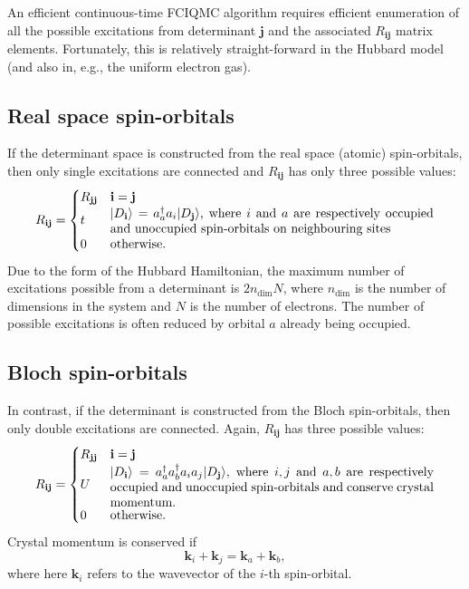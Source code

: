 \documentclass[a4paper, 11pt]{article}
\newcommand{\bi}{\mathbf{i}}
\newcommand{\bj}{\mathbf{j}}
\newcommand{\bk}{\mathbf{k}}
\newcommand{\ket}{\rangle}
\begin{document}
An efficient continuous-time FCIQMC algorithm requires efficient enumeration of all the possible excitations from determinant $\bj$ and the associated $R_{\bi\bj}$ matrix elements.  Fortunately, this is relatively straight-forward in the Hubbard model (and also in, e.g., the uniform electron gas).

\subsection{Real space spin-orbitals}

If the determinant space is constructed from the real space (atomic) spin-orbitals, then only single excitations are connected and $R_{\bi\bj}$ has only three possible values:
\begin{equation}
R_{\bi\bj} = \begin{cases} 
    R_{\bj\bj} & \bi = \bj \\
    t          & \textrm{\parbox{9cm}{$|D_\bi\ket=a^\dagger_a a_i|D_\bj\ket$, where $i$ and $a$ are respectively occupied and unoccupied spin-orbitals on neighbouring sites}} \\
    0          & \textrm{otherwise.}
\end{cases}
\end{equation}
Due to the form of the Hubbard Hamiltonian, the maximum number of excitations possible from a determinant is $2n_\textrm{dim}N$, where $n_\textrm{dim}$ is the number of dimensions in the system and $N$ is the number of electrons.  The number of possible excitations is often reduced by orbital $a$ already being occupied.

\subsection{Bloch spin-orbitals}

In contrast, if the determinant is constructed from the Bloch spin-orbitals, then only double excitations are connected.  Again, $R_{\bi\bj}$ has three possible values:
\begin{equation}
R_{\bi\bj} = \begin{cases} 
    R_{\bj\bj} & \bi = \bj \\
    U          & \textrm{\parbox{9cm}{$|D_\bi\ket=a^\dagger_a a^\dagger_b a_i a_j|D_\bj\ket$, where $i,j$ and $a,b$ are respectively occupied and unoccupied spin-orbitals and conserve crystal momentum.}} \\
    0          & \textrm{otherwise.}
\end{cases}
\end{equation}
Crystal momentum is conserved if 
\begin{equation}
\bk_i + \bk_j = \bk_a + \bk_b,
\end{equation}
where here $\bk_i$ refers to the wavevector of the $i$-th spin-orbital.
\end{document}
